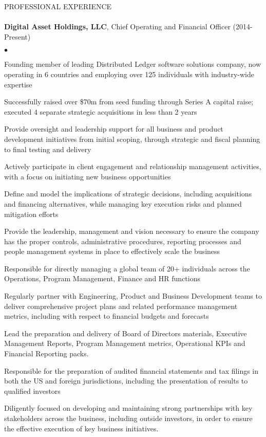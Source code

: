 \documentclass[12pt]{article}
\newcommand{\lineunder}{\vspace*{-9pt} \\ \hspace*{-18pt} \hrulefill \\}
\newcommand{\header}[1]{{\hspace*{-15pt}\vspace*{6pt} \textsc{#1}} \vspace*{-9pt} \lineunder}
\newcommand{\employer}[2]{{ #1 (#2) }}
\newenvironment{achievements}{\begin{list}{$\bullet$}{\topsep 0pt \itemsep -2pt}}{\vspace*{4pt}\end{list}}
\begin{document}
\header{PROFESSIONAL EXPERIENCE}
  \employer{\textbf{Digital Asset Holdings, LLC}, Chief Operating and Financial Officer}{2014-Present}
    \begin{achievements}
      \item Founding member of leading Distributed Ledger software solutions company,
            now operating in 6 countries and employing over 125 individuals with industry-wide expertise
      \item Successfully raised over \$70m from seed funding through Series A
            capital raise; executed 4 separate strategic acquisitions in less than 2 years
      \item Provide oversight and leadership support for all business and product
            development initiatives from initial scoping, through strategic and fiscal planning to final testing and delivery
      \item Actively participate in client engagement and relationship management
            activities, with a focus on initiating new business opportunities
      \item Define and model the implications of strategic decisions, including
            acquisitions and financing alternatives, while managing key execution risks and planned mitigation efforts
      \item Provide the leadership, management and vision necessary to ensure
            the company has the proper controls, administrative procedures,
            reporting processes and people management systems in place to
            effectively scale the business
      \item Responsible for directly managing a global team of 20+ individuals
            across the Operations, Program Management, Finance and HR functions
      \item Regularly partner with Engineering, Product and Business Development
            teams to deliver comprehensive project plans and related performance
            management metrics, including with respect to financial budgets and forecasts
      \item Lead the preparation and delivery of Board of Directors materials,
            Executive Management Reports, Program Management metrics, Operational
            KPIs and Financial Reporting packs.
      \item Responsible for the preparation of audited financial statements and
            tax filings in both the US and foreign jurisdictions, including the
            presentation of results to qualified investors
      \item Diligently focused on developing and maintaining strong partnerships
            with key stakeholders across the business, including outside investors,
            in order to ensure the effective execution of key business initiatives.
    \end{achievements}
\end{document}
